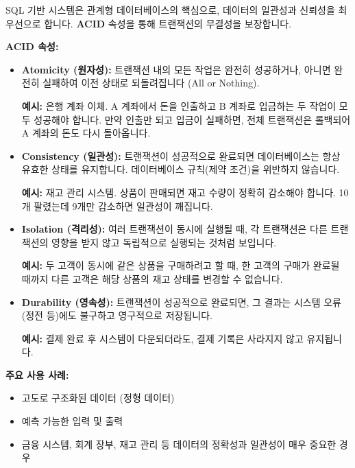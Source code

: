 \documentclass[11pt,a4paper]{article}
\begin{document}
\begin{summarybox}
SQL 기반 시스템은 관계형 데이터베이스의 핵심으로, 데이터의 일관성과 신뢰성을 최우선으로 합니다. \textbf{ACID} 속성을 통해 트랜잭션의 무결성을 보장합니다.
\end{summarybox}

\textbf{ACID 속성:}
\begin{itemize}
    \item \textbf{Atomicity (원자성):} 트랜잭션 내의 모든 작업은 완전히 성공하거나, 아니면 완전히 실패하여 이전 상태로 되돌려집니다 (All or Nothing).
    \begin{examplebox}
    \textbf{예시:} 은행 계좌 이체. A 계좌에서 돈을 인출하고 B 계좌로 입금하는 두 작업이 모두 성공해야 합니다. 만약 인출만 되고 입금이 실패하면, 전체 트랜잭션은 롤백되어 A 계좌의 돈도 다시 돌아옵니다.
    \end{examplebox}
    \item \textbf{Consistency (일관성):} 트랜잭션이 성공적으로 완료되면 데이터베이스는 항상 유효한 상태를 유지합니다. 데이터베이스 규칙(제약 조건)을 위반하지 않습니다.
    \begin{examplebox}
    \textbf{예시:} 재고 관리 시스템. 상품이 판매되면 재고 수량이 정확히 감소해야 합니다. 10개 팔렸는데 9개만 감소하면 일관성이 깨집니다.
    \end{examplebox}
    \item \textbf{Isolation (격리성):} 여러 트랜잭션이 동시에 실행될 때, 각 트랜잭션은 다른 트랜잭션의 영향을 받지 않고 독립적으로 실행되는 것처럼 보입니다.
    \begin{examplebox}
    \textbf{예시:} 두 고객이 동시에 같은 상품을 구매하려고 할 때, 한 고객의 구매가 완료될 때까지 다른 고객은 해당 상품의 재고 상태를 변경할 수 없습니다.
    \end{examplebox}
    \item \textbf{Durability (영속성):} 트랜잭션이 성공적으로 완료되면, 그 결과는 시스템 오류(정전 등)에도 불구하고 영구적으로 저장됩니다.
    \begin{examplebox}
    \textbf{예시:} 결제 완료 후 시스템이 다운되더라도, 결제 기록은 사라지지 않고 유지됩니다.
    \end{examplebox}
\end{itemize}

\textbf{주요 사용 사례:}
\begin{itemize}
    \item 고도로 구조화된 데이터 (정형 데이터)
    \item 예측 가능한 입력 및 출력
    \item 금융 시스템, 회계 장부, 재고 관리 등 데이터의 정확성과 일관성이 매우 중요한 경우
\end{itemize}
\end{document}
